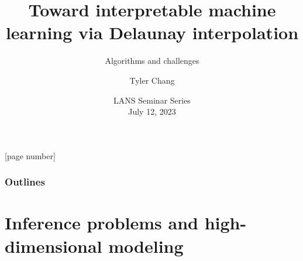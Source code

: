 \documentclass[aspectratio=169]{beamer}
\title{Toward interpretable machine learning via Delaunay interpolation}
\subtitle{Algorithms and challenges}
\author{Tyler Chang}
\date{LANS Seminar Series\\
July 12, 2023}
\institute{Argonne National Laboratory}
\begin{document}
{
\frame{\titlepage}
}

[page number]{}

\begin{frame}
  \frametitle{Outlines}
  \tableofcontents
\end{frame}

\section{Inference problems and high-dimensional modeling}
\end{document}
